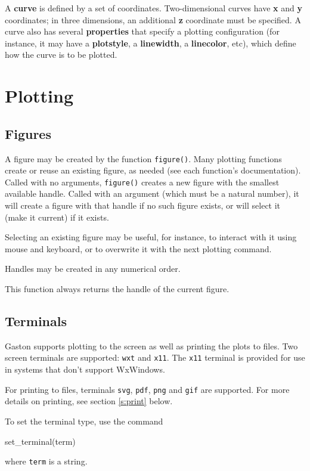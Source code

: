 \documentclass[11pt]{article}
\newcommand{\cmd}[1]{\texttt{#1}}
\begin{document}
A \textbf{curve} is defined by a set of coordinates. Two-dimensional curves
have \textbf{x} and \textbf{y} coordinates; in three dimensions, an additional
\textbf{z} coordinate must be specified. A curve also has several
\textbf{properties} that specify a plotting configuration (for instance, it may
have a \textbf{plotstyle}, a \textbf{linewidth}, a \textbf{linecolor}, etc),
which define how the curve is to be plotted.

\section{Plotting}
\label{hilevel}

\subsection{Figures}

A figure may be created by the function \cmd{figure()}. Many plotting functions
create or reuse an existing figure, as needed (see each function's
documentation). Called with no arguments, \cmd{figure()} creates a new figure
with the smallest available handle. Called with an argument (which must be a
natural number), it will create a figure with that handle if no such figure
exists, or will select it (make it current) if it exists.

Selecting an existing figure may be useful, for instance, to interact with it
using mouse and keyboard, or to overwrite it with the next plotting command.

Handles may be created in any numerical order.

This function always returns the handle of the current figure.

\subsection{Terminals}

Gaston supports plotting to the screen as well as printing the plots to files.
Two screen terminals are supported: \cmd{wxt} and \cmd{x11}. The \cmd{x11}
terminal is provided for use in systems that don't support WxWindows.

For printing to files, terminals \cmd{svg}, \cmd{pdf}, \cmd{png} and \cmd{gif}
are supported. For more details on printing, see section \ref{s:print} below.

To set the terminal type, use the command
\begin{juliacode}
set_terminal(term)
\end{juliacode}
where \cmd{term} is a string.
\end{document}
